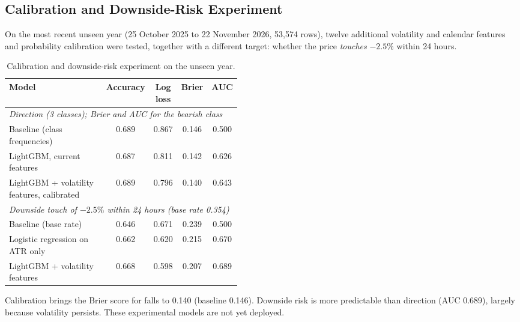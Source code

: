 \subsection{Calibration and Downside-Risk Experiment}
On the most recent unseen year (25 October 2025 to 22 November 2026, 53{,}574 rows), twelve additional volatility and calendar features and probability calibration were tested, together with a different target: whether the price \textit{touches} $-2.5\%$ within 24 hours.
\begin{table}[H]\centering
\renewcommand{\arraystretch}{1.3}
\begin{tabular}{|p{0.45\linewidth}|c|c|c|c|}\hline
\textbf{Model} & \textbf{Accuracy} & \textbf{Log loss} & \textbf{Brier} & \textbf{AUC}\\\hline
\multicolumn{5}{|l|}{\textit{Direction (3 classes); Brier and AUC for the bearish class}}\\\hline
Baseline (class frequencies) & 0.689 & 0.867 & 0.146 & 0.500\\\hline
LightGBM, current features & 0.687 & 0.811 & 0.142 & 0.626\\\hline
LightGBM + volatility features, calibrated & 0.689 & 0.796 & 0.140 & 0.643\\\hline
\multicolumn{5}{|l|}{\textit{Downside touch of $-2.5\%$ within 24 hours (base rate 0.354)}}\\\hline
Baseline (base rate) & 0.646 & 0.671 & 0.239 & 0.500\\\hline
Logistic regression on ATR only & 0.662 & 0.620 & 0.215 & 0.670\\\hline
LightGBM + volatility features & 0.668 & 0.598 & 0.207 & 0.689\\\hline
\end{tabular}
\caption{Calibration and downside-risk experiment on the unseen year.}\label{tab:experiment}
\end{table}
Calibration brings the Brier score for falls to 0.140 (baseline 0.146). Downside risk is more predictable than direction (AUC 0.689), largely because volatility persists. These experimental models are not yet deployed.

